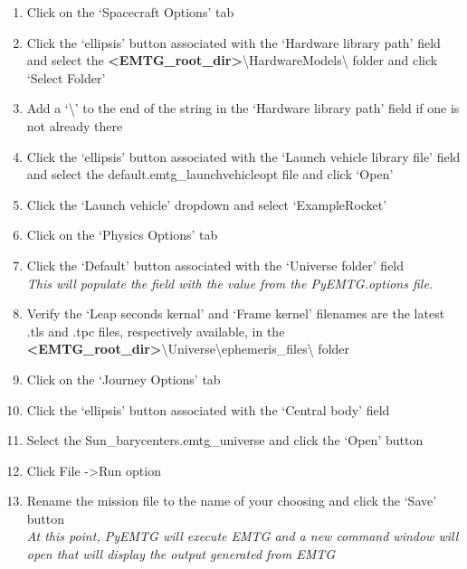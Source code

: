 \begin{enumerate}
	\item Click on the `Spacecraft Options' tab 
	\item Click the `ellipsis' button associated with the `Hardware library path' field and select the \textbf{\textless EMTG\_root\_dir\textgreater}\textbackslash HardwareModels\textbackslash \hspace{1pt} folder and click `Select Folder'
	\item Add a `\textbackslash' \hspace{1pt} to the end of the string in the `Hardware library path' field if one is not already there
	\item Click the `ellipsis' button associated with the `Launch vehicle library file' field and select the default.emtg\_launchvehicleopt file and click `Open'
	\item Click the `Launch vehicle' dropdown and select `ExampleRocket'
	\item Click on the `Physics Options' tab 
	\item Click the `Default' button associated with the `Universe folder' field \\ \emph{This will populate the field with the value from the PyEMTG.options file.}
	\item Verify the `Leap seconds kernal' and `Frame kernel' filenames are the latest .tls and .tpc files, respectively available, in the \textbf{\textless EMTG\_root\_dir\textgreater}\textbackslash Universe\textbackslash ephemeris\_files\textbackslash \hspace{1pt} folder
	\item Click on the `Journey Options' tab 
	\item Click the `ellipsis' button associated with the `Central body' field
	\item Select the Sun\_barycenters.emtg\_universe and click the `Open' button
	\item Click File -\textgreater \hspace{1pt}Run option
	\item Rename the mission file to the name of your choosing and click the `Save' button \\ \emph{At this point, PyEMTG will execute EMTG and a new command window will open that will display the output generated from EMTG}
\end{enumerate}